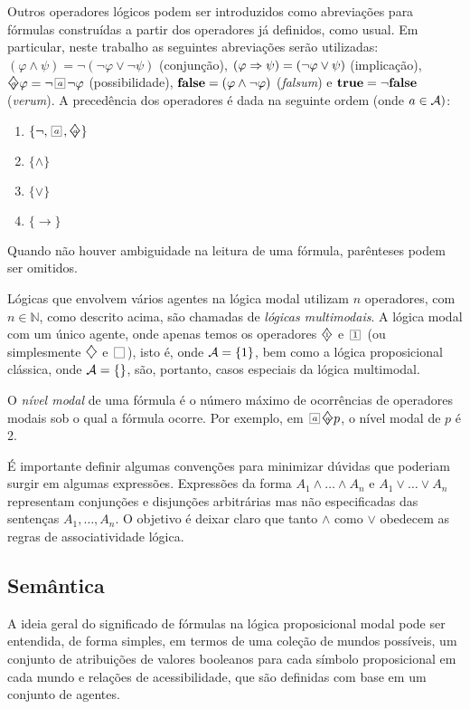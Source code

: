 Outros operadores lógicos podem ser introduzidos como abreviações para fórmulas
construídas a partir dos operadores já definidos, como usual. Em particular,
neste trabalho as seguintes abreviações serão utilizadas: $(\varphi \land \psi)
= \neg (\neg \varphi \lor \neg \psi)$ (conjunção), $(\varphi \Rightarrow \psi) = (\neg
\varphi \lor \psi)$ (implicação), $\pos{\agent} \varphi= \neg \nec{\agent} \neg
\varphi$ (possibilidade), $\mbox{\rm\bf false} = (\varphi \land \neg \varphi)$
(\emph{falsum}) e $\mbox{\rm\bf true} = \neg \mbox{\rm\bf false}$ (\emph{verum}). A precedência dos
operadores é dada na seguinte ordem (onde $a \in {\cal{A}})$:
\begin{enumerate} 
    \item $\{\neg, \nec{\agent}, \pos{\agent}\}$ 
    \item $\{\wedge\}$ 
    \item $\{\vee\}$ 
    \item $\{\rightarrow\}$ 
\end{enumerate}

Quando não houver ambiguidade na leitura de uma fórmula, parênteses podem ser
omitidos.

Lógicas que envolvem vários agentes na lógica modal utilizam $n$ operadores, com
$n \in \mathbb{N}$, como descrito acima, são chamadas de \emph{lógicas
multimodais}. A lógica modal com um único agente, onde apenas temos os
operadores $\pos{1}$ e $\nec{1}$ (ou simplesmente $\pos{}$ e $\nec{}$), isto é,
onde ${\cal{A}} =\{1\}$, bem como a lógica proposicional clássica, onde ${\cal{A}} =
\{\}$, são, portanto, casos especiais da lógica multimodal.

O \emph{nível modal} de uma fórmula é o número máximo de ocorrências de
operadores modais sob o qual a fórmula ocorre. Por exemplo, em
$\nec{\agent}\pos{\agent}p$, o nível modal de $p$ é 2.

É importante definir algumas convenções para minimizar 
dúvidas que poderiam surgir em algumas expressões.
Expressões da forma $A_1 \wedge \ldots \wedge A_n$ e $A_1 \vee \ldots \vee A_n$
representam conjunções e disjunções arbitrárias mas não especificadas das
sentenças $A_1,\ldots,A_n$. O objetivo é deixar claro que tanto $\wedge$ como
$\vee$ obedecem as regras de associatividade lógica. 

\subsection{Semântica}
\label{semantics}

A ideia geral do significado de fórmulas na lógica proposicional modal pode ser
entendida, de forma simples, em termos de uma coleção de mundos possíveis, um conjunto
de atribuições de valores booleanos para cada símbolo proposicional em cada
mundo e relações de acessibilidade, que são definidas com base em um conjunto de
agentes.

